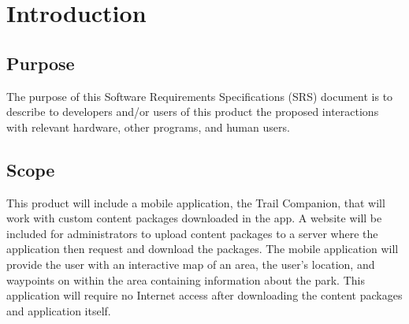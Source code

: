 \documentclass[letterpaper, 10pt,titlepage]{article}
\begin{document}
\section{Introduction}
\subsection{Purpose}
The purpose of this Software Requirements Specifications (SRS) document is to describe to developers and/or users of this product the proposed interactions with relevant hardware, other programs, and human users. 

\subsection{Scope}
This product will include a mobile application, the Trail Companion, that will work with custom content packages downloaded in the app. A website will be included for administrators to upload content packages to a server where the application then request and download the packages. The mobile application will provide the user with an interactive map of an area, the user’s location, and waypoints on within the area containing information about the park. This application will require no Internet access after downloading the content packages and application itself.
\end{document}
